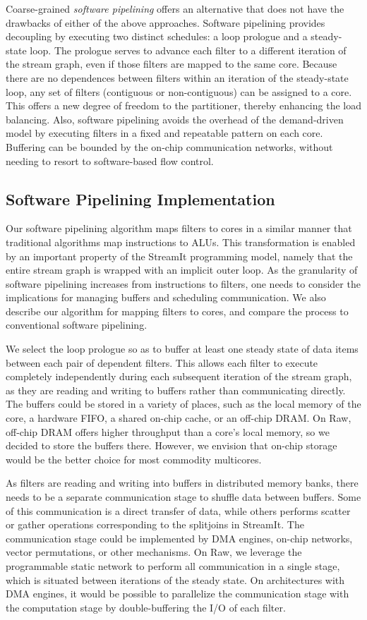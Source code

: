 Coarse-grained {\it software pipelining} offers an alternative that
does not have the drawbacks of either of the above approaches.
Software pipelining provides decoupling by executing two distinct
schedules: a loop prologue and a steady-state loop.  The prologue
serves to advance each filter to a different iteration of the stream
graph, even if those filters are mapped to the same core.  Because
there are no dependences between filters within an iteration of the
steady-state loop, any set of filters (contiguous or non-contiguous)
can be assigned to a core.  This offers a new degree of freedom to the
partitioner, thereby enhancing the load balancing.  Also, software
pipelining avoids the overhead of the demand-driven model by executing
filters in a fixed and repeatable pattern on each core.  Buffering can
be bounded by the on-chip communication networks, without needing to
resort to software-based flow control.

\subsection{Software Pipelining Implementation}

Our software pipelining algorithm maps filters to cores in a similar
manner that traditional algorithms map instructions to ALUs.  This
transformation is enabled by an important property of the StreamIt
programming model, namely that the entire stream graph is wrapped with
an implicit outer loop.  As the granularity of software pipelining
increases from instructions to filters, one needs to consider the
implications for managing buffers and scheduling communication.  We
also describe our algorithm for mapping filters to cores, and compare
the process to conventional software pipelining.

We select the loop prologue so as to buffer at least one steady state
of data items between each pair of dependent filters.  This allows
each filter to execute completely independently during each subsequent
iteration of the stream graph, as they are reading and writing to
buffers rather than communicating directly.  The buffers could be
stored in a variety of places, such as the local memory of the core, a
hardware FIFO, a shared on-chip cache, or an off-chip DRAM.  On Raw,
off-chip DRAM offers higher throughput than a core's local memory, so
we decided to store the buffers there.  However, we envision that
on-chip storage would be the better choice for most commodity
multicores.

As filters are reading and writing into buffers in distributed memory
banks, there needs to be a separate communication stage to shuffle
data between buffers.  Some of this communication is a direct transfer
of data, while others performs scatter or gather operations
corresponding to the splitjoins in StreamIt.  The communication stage
could be implemented by DMA engines, on-chip networks, vector
permutations, or other mechanisms.  On Raw, we leverage the
programmable static network to perform all communication in a single
stage, which is situated between iterations of the steady state.  On
architectures with DMA engines, it would be possible to parallelize
the communication stage with the computation stage by double-buffering
the I/O of each filter.

